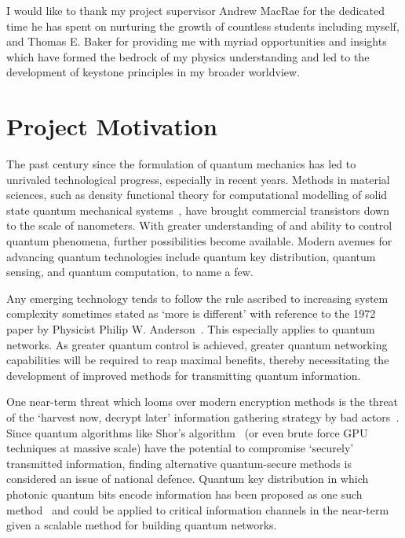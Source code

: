 \documentclass[aps,pra,showpacs,amsmath,amssymb,nofootinbib,longbibliography,superscriptaddress
]{revtex4-1}
\theoremstyle{definition}
\theoremstyle{remark}
\newcommand{\0}{\hat{0}}
\begin{document}
\vspace{2.5cm}

\begin{center}
I would like to thank my project supervisor Andrew MacRae for the dedicated time he has spent on nurturing the growth of countless students including myself, and Thomas E. Baker for providing me with myriad opportunities and insights which have formed the bedrock of my physics understanding and led to the development of keystone principles in my broader worldview.
\end{center}

\clearpage


\section{Project Motivation}

The past century since the formulation of quantum mechanics has led to unrivaled technological progress, especially in recent years. Methods in material sciences, such as density functional theory for computational modelling of solid state quantum mechanical systems~\cite{DFT}, have brought commercial transistors down to the scale of nanometers. With greater understanding of and ability to control quantum phenomena, further possibilities become available. Modern avenues for advancing quantum technologies include quantum key distribution, quantum sensing, and quantum computation, to name a few.

Any emerging technology tends to follow the rule ascribed to increasing system complexity sometimes stated as `more is different' with reference to the 1972 paper by Physicist Philip W. Anderson~\cite{Philip}. This especially applies to quantum networks. As greater quantum control is achieved, greater quantum networking capabilities will be required to reap maximal benefits, thereby necessitating the development of improved methods for transmitting quantum information.

One near-term threat which looms over modern encryption methods is the threat of the `harvest now, decrypt later' information gathering strategy by bad actors~\cite{Harvest}. Since quantum algorithms like Shor's algorithm~\cite{Shor} (or even brute force GPU techniques at massive scale) have the potential to compromise `securely' transmitted information, finding alternative quantum-secure methods is considered an issue of national defence. Quantum key distribution in which photonic quantum bits encode information has been proposed as one such method~\cite{QKD} and could be applied to critical information channels in the near-term given a scalable method for building quantum networks.
\end{document}
